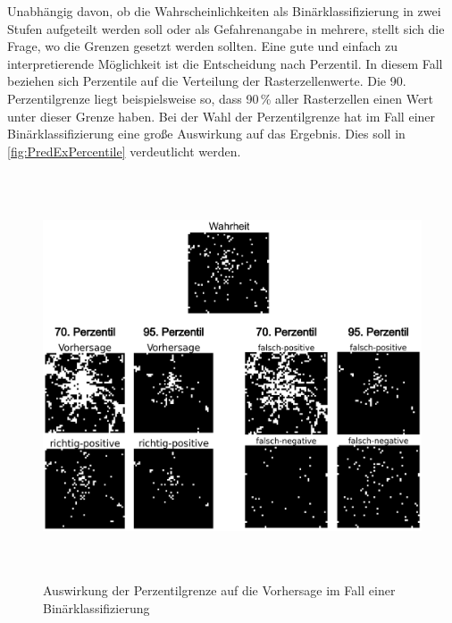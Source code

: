 Unabhängig davon, ob die Wahrscheinlichkeiten als Binärklassifizierung in zwei Stufen aufgeteilt werden soll oder als Gefahrenangabe in mehrere, stellt sich die Frage, wo die Grenzen gesetzt werden sollten.
Eine gute und einfach zu interpretierende Möglichkeit ist die Entscheidung nach Perzentil.
In diesem Fall beziehen sich Perzentile auf die Verteilung der Rasterzellenwerte.
Die 90. Perzentilgrenze liegt beispielsweise so, dass 90\,\% aller Rasterzellen einen Wert unter dieser Grenze haben.
Bei der Wahl der Perzentilgrenze hat im Fall einer Binärklassifizierung eine große Auswirkung auf das Ergebnis.
Dies soll in \autoref{fig:PredExPercentile} verdeutlicht werden.

\begin{figure}[h]
    \centering
    \includegraphics[width=1.0\textwidth,height=12cm,keepaspectratio=true]{content/images/PredExPercentile.png}
    \caption{Auswirkung der Perzentilgrenze auf die Vorhersage im Fall einer Binärklassifizierung}
    \label{fig:PredExPercentile}
\end{figure}

